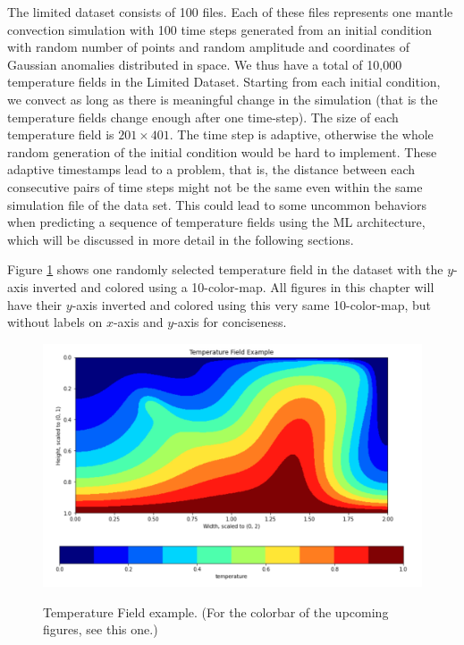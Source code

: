 The limited dataset consists of 100 files.  Each of these files represents one mantle convection simulation with 100 time steps generated from an initial condition with random number of points and random amplitude and coordinates of Gaussian anomalies distributed in space. We thus have a total of 10,000 temperature fields in the Limited Dataset. Starting from each initial condition, we convect as long as there is meaningful change in the simulation (that is the temperature fields change enough after one time-step). The size of each temperature field is $201 \times 401$. The time step is adaptive, otherwise the whole random generation of the initial condition would be hard to implement. These adaptive timestamps lead to a problem, that is, the distance between each consecutive pairs of time steps might not be the same even within the same simulation file of the data set. This could lead to some uncommon behaviors when predicting a sequence of temperature fields using the ML architecture, which will be discussed in more detail in the following sections.

Figure \ref{figure:temperature_field_sample} shows one randomly selected temperature field in the dataset with the $y$-axis inverted and colored using a 10-color-map. All figures in this chapter will have their $y$-axis inverted and colored using this very same 10-color-map, but without labels on $x$-axis and $y$-axis for conciseness.

\begin{figure}[H]
    \caption{Temperature Field example. (For the colorbar of the upcoming figures, see this one.)}
    \includegraphics[scale=0.6]{figures/mantle_convection_images/temperature_field_example.png}
    \label{figure:temperature_field_sample}
\end{figure}

